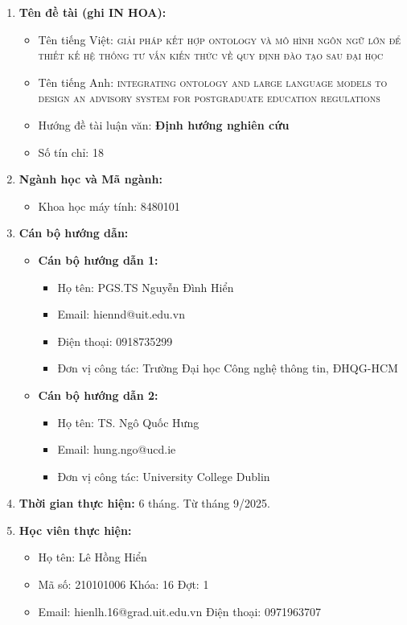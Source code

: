 \documentclass[a4paper,12pt]{article}
\begin{document}
\begin{enumerate}[leftmargin=1.5em]
    \item \textbf{Tên đề tài (ghi IN HOA):}
    \begin{itemize}
        \item Tên tiếng Việt: {\scshape\large giải pháp kết hợp ontology và mô hình ngôn ngữ lớn để thiết kế hệ thống tư vấn kiến thức về quy định đào tạo sau đại học}
        \item Tên tiếng Anh: {\scshape\large integrating ontology and large language models to design an advisory system for postgraduate education regulations}
        \item Hướng đề tài luận văn: \textbf{Định hướng nghiên cứu} 
        \item Số tín chỉ: 18
    \end{itemize}
    \item \textbf{Ngành học và Mã ngành:}
    \begin{itemize}
        \item Khoa học máy tính: 8480101 
    \end{itemize}
    \item \textbf{Cán bộ hướng dẫn:}
    \begin{itemize}
        \item \textbf{Cán bộ hướng dẫn 1:}
        \begin{itemize}
            \item Họ tên: PGS.TS Nguyễn Đình Hiển
            \item Email: hiennd@uit.edu.vn
            \item Điện thoại: 0918735299
            \item Đơn vị công tác: Trường Đại học Công nghệ thông tin, ĐHQG-HCM
        \end{itemize}
        \item \textbf{Cán bộ hướng dẫn 2:}
        \begin{itemize}
            \item Họ tên: TS. Ngô Quốc Hưng
            \item Email: hung.ngo@ucd.ie
            \item Đơn vị công tác: University College Dublin
        \end{itemize}
    \end{itemize}
    \item \textbf{Thời gian thực hiện:} 6 tháng. Từ tháng 9/2025.
    \item \textbf{Học viên thực hiện:}
    \begin{itemize}
        \item Họ tên: Lê Hồng Hiển
        \item Mã số: 210101006 \hspace{1em} Khóa: 16 \hspace{1em} Đợt: 1
        \item Email: hienlh.16@grad.uit.edu.vn \hspace{1em} Điện thoại: 0971963707
    \end{itemize}
\end{enumerate}
\end{document}
